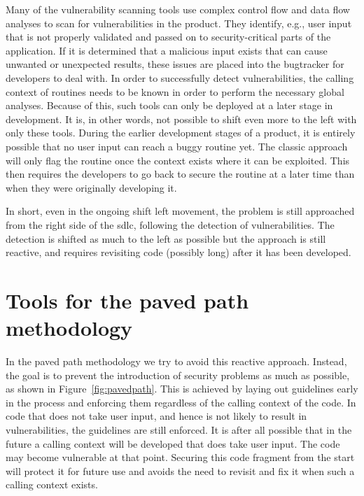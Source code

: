 Many of the vulnerability scanning tools use complex control flow and data flow analyses to scan for vulnerabilities in the product. They identify, e.g., user input that is not properly validated and passed on to security-critical parts of the application. If it is determined that a malicious input exists that can cause unwanted or unexpected results, these issues are placed into the \gls{bugtracker} for developers to deal with. In order to successfully detect vulnerabilities, the calling context of routines needs to be known in order to perform the necessary global analyses. Because of this, such tools can only be deployed at a later stage in development. It is, in other words, not possible to shift even more to the left with only these tools. During the earlier development stages of a product, it is entirely possible that no user input can reach a buggy routine yet. The classic approach will only flag the routine once the context exists where it can be exploited. This then requires the developers to go back to secure the routine at a later time than when they were originally developing it. 

In short, even in the ongoing shift left movement, the problem is still approached from the right side of the \gls{sdlc}, following the detection of vulnerabilities. The detection is shifted as much to the left as possible but the approach is still reactive, and requires revisiting code (possibly long) after it has been developed. 

\section{Tools for the paved path methodology}
In the paved path methodology we try to avoid this reactive approach.
Instead, the goal is to prevent the introduction of \glspl{security problem} as much as possible, as shown in Figure~\ref{fig:pavedpath}.
This is achieved by laying out guidelines early in the process and enforcing them regardless of the calling context of the code. 
In code that does not take user input, and hence is not likely to result in vulnerabilities, the guidelines are still enforced.
It is after all possible that in the future a calling context will be developed that does take user input.
The code may become vulnerable at that point.
Securing this code fragment from the start will protect it for future use and avoids the need to revisit and fix it when such a calling context exists. 

